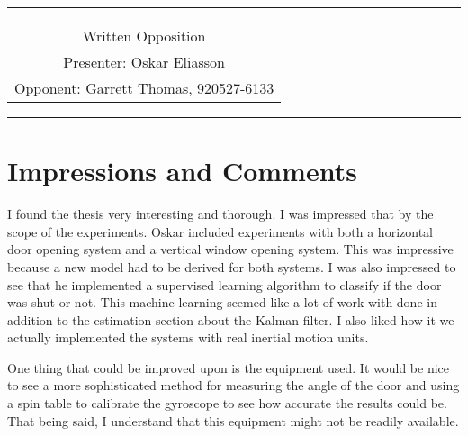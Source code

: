\documentclass[12pt,a4paper]{report}
\begin{document}
\tabulinesep=1.2mm
\begin{center}
\hrule
\begin{tabular}{c}
\\[0.005cm]
\Large{Written Opposition}\\[0.3cm] %
Presenter: Oskar Eliasson \\
Opponent: Garrett Thomas, 920527-6133   \\[0.2cm]
\end{tabular}
\hrule
\end{center}

\section{Impressions and Comments}
I found the thesis very interesting and thorough. I was impressed that by the scope of the experiments. Oskar included experiments with both a horizontal door opening system and a vertical window opening system. This was impressive because a new model had to be derived for both systems. I was also impressed to see that he implemented a supervised learning algorithm to classify if the door was shut or not. This machine learning seemed like a lot of work with done in addition to the estimation section about the Kalman filter. I also liked how it we actually implemented the systems with real inertial motion units.

One thing that could be improved upon is the equipment used. It would be nice to see a more sophisticated method for measuring the angle of the door and using a spin table to calibrate the gyroscope to see how accurate the results could be. That being said, I understand that this equipment might not be readily available. 
\end{document}
